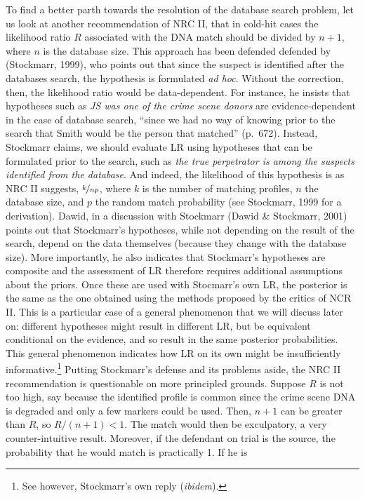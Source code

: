 \documentclass[10pt,dvipsnames,enabledeprecatedfontcommands]{scrartcl}
\begin{document}
To find a better parth towards the resolution of the database search
problem, let us look at another recommendation of NRC II, that in
cold-hit cases the likelihood ratio \(R\) associated with the DNA match
should be divided by \(n+1\), where \(n\) is the database size. This
approach has been defended defended by (Stockmarr, 1999), who points out
that since the suspect is identified after the databases search, the
hypothesis is formulated \textit{ad hoc}. Without the correction, then,
the likelihood ratio would be data-dependent. For instance, he insists
that hypotheses such as \emph{JS was one of the crime scene donors} are
evidence-dependent in the case of database search, ``since we had no way
of knowing prior to the search that Smith would be the person that
matched'' (p.~672). Instead, Stockmarr claims, we should evaluate LR
using hypotheses that can be formulated prior to the search, such as
\emph{the true perpetrator is among the suspects identified from the database}.
And indeed, the likelihood of this hypothesis is as NRC II suggests,
\(\nicefrac{k}{np}\), where \(k\) is the number of matching profiles,
\(n\) the database size, and \(p\) the random match probability (see
Stockmarr, 1999 for a derivation). Dawid, in a discussion with Stockmarr
(Dawid \& Stockmarr, 2001) points out that Stockmarr's hypotheses, while
not depending on the result of the search, depend on the data themselves
(because they change with the database size). More importantly, he also
indicates that Stockmarr's hypotheses are composite and the assessment
of LR therefore requires additional assumptions about the priors. Once
these are used with Stocmarr's own LR, the posterior is the same as the
one obtained using the methods proposed by the critics of NCR II. This
is a particular case of a general phenomenon that we will discuss later
on: different hypotheses might result in different LR, but be equivalent
conditional on the evidence, and so result in the same posterior
probabilities. This general phenomenon indicates how LR on its own might
be insufficiently informative.\footnote{See however, Stockmarr's own
  reply (\emph{ibidem}).} Putting Stockmarr's defense and its problems
aside, the NRC II recommendation is questionable on more principled
grounds. Suppose \(R\) is not too high, say because the identified
profile is common since the crime scene DNA is degraded and only a few
markers could be used. Then, \(n+1\) can be greater than \(R\), so
\(R/(n+1)<1\). The match would then be exculpatory, a very
counter-intuitive result. Moreover, if the defendant on trial is the
source, the probability that he would match is practically 1. If he is
\end{document}
